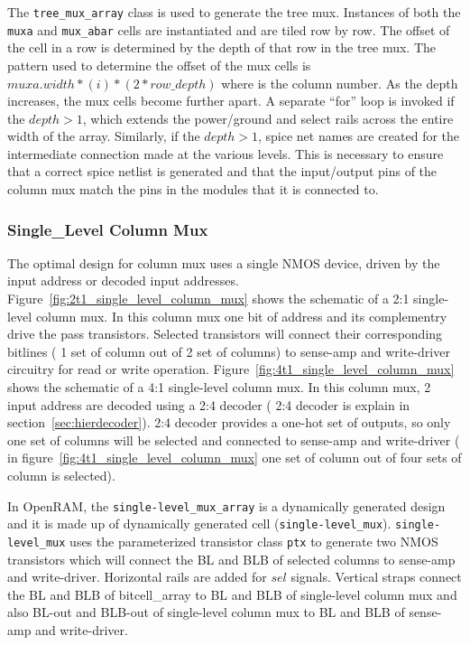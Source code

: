 The \verb|tree_mux_array| class is used to generate the tree mux.
Instances of both the \verb|muxa| and \verb|mux_abar| cells are instantiated and
are tiled row by row.  The offset of the cell in a row is determined
by the depth of that row in the tree mux.  The pattern used to
determine the offset of the mux cells is
$muxa.width*(i)*(2*row\_depth)$ where is the column number.  As the
depth increases, the mux cells become further apart.  A separate
``for'' loop is invoked if the $depth>1$, which extends the
power/ground and select rails across the entire width of the array.
Similarly, if the $depth>1$, spice net names are created for the
intermediate connection made at the various levels.  This is necessary
to ensure that a correct spice netlist is generated and that the
input/output pins of the column mux match the pins in the modules that
it is connected to.


\subsubsection{Single\_Level Column Mux}
\label{sec:single_level_column_mux}

The optimal design for column mux uses a single NMOS device, driven by the input address or decoded input addresses.
Figure~\ref{fig:2t1_single_level_column_mux} shows the schematic of a 2:1 single-level column mux. In this column mux one bit 
of address and its complementry drive the pass transistors. Selected transistors will  
connect their corresponding bitlines ( 1 set of column out of 2 set of columns) to sense-amp and write-driver circuitry for read or write operation. 
Figure~\ref{fig:4t1_single_level_column_mux} shows the schematic of a 4:1 single-level column mux. In this column mux, 2 input 
address are decoded using a 2:4 decoder ( 2:4 decoder is explain in section~\ref{sec:hierdecoder}). 2:4 decoder provides a one-hot set of outputs, so only one set of columns 
will be selected and connected to sense-amp and write-driver
( in figure~\ref{fig:4t1_single_level_column_mux} one set of column out of four sets of column is selected).

In OpenRAM, the \verb|single-level_mux_array| is a dynamically generated design and 
it is made up of dynamically generated cell (\verb|single-level_mux|).
\verb|single-level_mux| uses the parameterized transistor class \verb|ptx| to generate two NMOS transistors 
which will connect the BL and BLB of selected columns to sense-amp and write-driver. Horizontal rails are added for $sel$ signals. Vertical   
straps connect the BL and BLB of bitcell\_array to BL and BLB of single-level column mux and also BL-out and BLB-out of single-level 
column mux to BL and BLB of sense-amp and write-driver.


